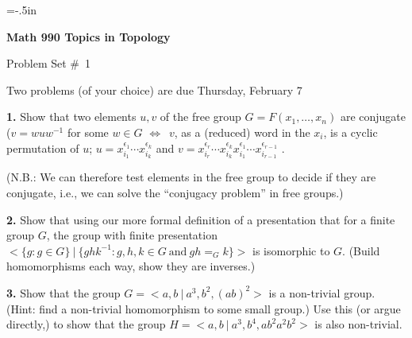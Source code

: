 

\overfullrule=0pt
\parindent=0pt
\voffset=-.5in
\vsize=10in
\nopagenumbers




\loadmsbm

\def\ctln{\centerline}
\def\u{\underbar}
\def\ssk{\smallskip}
\def\msk{\medskip}
\def\bsk{\bigskip}
\def\hsk{\hskip.1in}
\def\hhsk{\hskip.2in}

\def\dsl{\displaystyle}
\def\hskp{\hskip1.5in}
\def\ra{\rightarrow}
\def\lra{$\Leftrightarrow$}
\def\pu{\pi_1}
\def\mpu{$\pi_1$}
\def\bra{$\Rightarrow$}
\def\bbr{{\Bbb R}}
\def\bbz{{\Bbb Z}}
\def\del{\partial}
\def\indt{\item{}}



\ctln{\bf Math 990 Topics in Topology}

\ssk

\ctln{Problem Set \#\ 1}

\ssk

\ctln{Two problems (of your choice) are due Thursday, February 7}

\bsk

\item{\bf 1.} Show that two elements $u,v$ of the free group
$G=F(x_1,\ldots,x_n)$ are conjugate ($v=wuw^{-1}$ for some
$w\in G$ \lra\ $v$, as a (reduced) word
in the $x_i$, is a cyclic permutation of $u$; 
$u=x_{i_1}^{\epsilon_1}\cdots x_{i_k}^{\epsilon_k}$ and
$v=x_{i_r}^{\epsilon_r}\cdots x_{i_k}^{\epsilon_k}
x_{i_1}^{\epsilon_1}\cdots x_{i_{r-1}}^{\epsilon_{r-1}}$ .

\ssk

(N.B.: We can therefore test elements in the free group to decide if 
they are conjugate, i.e., we can solve the ``conjugacy problem'' in free groups.)

\msk

\item{\bf 2.} Show that using our more formal definition of a
presentation that for a finite group $G$, the group with
finite presentation 
$<\{g : g\in G\}\ |\ \{ghk^{-1} : g,h,k\in G \ \text{and}\ gh=_Gk\}>$
is isomorphic to $G$. (Build homomorphisms each way, show they are
inverses.)

\msk

\item{\bf 3.} Show that the group $G=<a,b\ |\ a^3,b^2,(ab)^2>$
is a non-trivial group. (Hint: find a non-trivial homomorphism
to some small group.) Use this (or argue directly,) to show that the
group $H=<a,b\ |\ a^3,b^4,ab^2a^2b^2>$ is also non-trivial.

